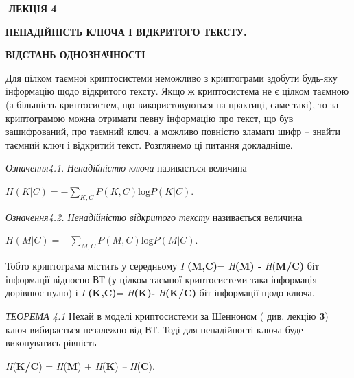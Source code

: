 \documentclass[a4paper]{article}
\newcounter{}
\begin{document}
\bigskip


\bigskip


\bigskip

 $ $\textbf{ ЛЕКЦІЯ  4}


\bigskip

{\centering\bfseries
НЕНАДІЙНІСТЬ  КЛЮЧА  І  ВІДКРИТОГО  ТЕКСТУ.
\par}

{\centering\bfseries
 ВІДСТАНЬ  ОДНОЗНАЧНОСТІ
\par}


\bigskip


\bigskip

Для цілком таємної криптосистеми неможливо з криптограми здобути будь-яку
інформацію щодо відкритого тексту. Якщо ж криптосистема не є цілком таємною (а
більшість криптосистем, що використовуються на практиці, саме такі), то за
криптограмою  можна отримати певну інформацію про текст, що був зашифрований,
про таємний ключ, а можливо повністю зламати шифр – знайти таємний ключ і
відкритий текст. Розглянемо ці питання докладніше.


\bigskip

\textit{Означення4.1}.  \textit{Ненадійністю ключа }називається  величина 

{\centering
  ${H(K|C)=-\underset{{K,C}}{\sum }{P(K,C)\text{log}P(K|C)}}$.
\par}

\textit{Означення4.2}\textit{. Ненадійністю відкритого }\textit{тексту}
називається  величина 

{\centering
 ${H(M|C)=-\underset{{M,C}}{\sum }{P(M,C)\text{log}P(M|C)}}$. $ $
\par}

Тобто  криптограма  містить у середньому \textit{I}\textit{
}\textbf{(}\textbf{M}\textbf{,}\textbf{C}\textbf{)}=\textit{
}\textit{H}\textbf{(}\textbf{M}\textbf{) -
}\textit{H}(\textbf{M}\textbf{/}\textbf{C}\textbf{)}\textbf{  }біт\textbf{
}інформації відносно ВТ (у цілком таємної криптосистеми така інформація
дорівнює нулю) і  \textit{I}\textit{
}\textbf{(}\textbf{K}\textbf{,}\textbf{C}\textbf{)}=\textit{
}\textit{H}\textbf{(}\textbf{K}\textbf{)-}\textit{
}\textit{H}\textbf{(}\textbf{K}\textbf{/}\textbf{C}\textbf{)}\textbf{ }біт
інформації щодо ключа. 

\textit{ТЕОРЕМА 4.1}\textit{  }Нехай в моделі криптосистеми за Шенноном  ( див.
лекцію \textbf{3})  ключ вибирається незалежно від ВТ. Тоді для ненадійності 
ключа буде виконуватись рівність  

{\centering
\textit{H}(\textbf{K}\textbf{/}\textbf{C}) =  \textit{H}(\textbf{M}) +
\textit{H}(\textbf{K}) \textit{– }\textit{H}(\textbf{C}).
\par}
\end{document}
